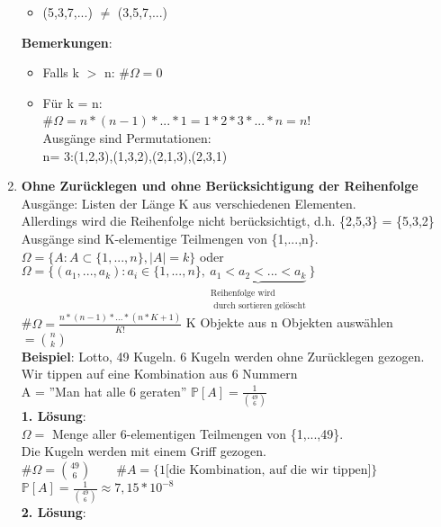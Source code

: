\begin{enumerate}
\begin{itemize}
		\item (5,3,7,...) $\neq$ (3,5,7,...)
	\end{itemize}
	\textbf{Bemerkungen}: 
	\begin{itemize}
		\item Falls k $>$ n: \#$\Omega = 0$
		\item Für k = n:\\
		\#$\Omega = n*(n-1)*...*1 = 1*2*3*...*n = n!$\\Ausgänge sind Permutationen:\\n= 3:(1,2,3),(1,3,2),(2,1,3),(2,3,1)
	\end{itemize}
	\item \textbf{Ohne Zurücklegen und ohne Berücksichtigung der Reihenfolge}\\
	Ausgänge: Listen der Länge K aus verschiedenen Elementen.\\
	Allerdings wird die Reihenfolge nicht berücksichtigt, d.h. \{2,5,3\} = \{5,3,2\}\smallskip\\
	Ausgänge sind K-elementige Teilmengen von \{1,...,n\}.\\
	$\Omega = \{A:A\subset\{1,...,n\},|A| = k\}$ oder \\
	$\Omega = \{(a_1,...,a_k):a_i \in \{1,...,n\},\underbrace{a_1<a_2<...<a_k}_{\substack{\text{Reihenfolge wird}\\\text{ durch sortieren gelöscht}}} \}$\medskip\\
	\#$\Omega = \frac{n*(n-1)*...*(n*K+1)}{K!}$ \hspace{0.5cm}K Objekte aus n Objekten auswählen\smallskip\\
	$ = \binom{n}{k}$\medskip\\
	\textbf{Beispiel}: Lotto, 49 Kugeln. 6 Kugeln werden ohne Zurücklegen gezogen.\\ 
	Wir tippen auf eine Kombination aus 6 Nummern\smallskip\\
	A = ''Man hat alle 6 geraten'' $\mathds{P}[A] = \frac{1}{\binom{49}{6}}$\medskip\\
	\textbf{1. Lösung}:\\
	$\Omega = $ Menge aller 6-elementigen Teilmengen von \{1,...,49\}. \\
	Die Kugeln werden mit einem Griff gezogen.\medskip\\
	\#$\Omega = \binom{49}{6} \qquad \#A = \{1 \text{[die Kombination, auf die wir tippen]}\}$\\
	$\mathds{P}[A] = \frac{1}{\binom{49}{6}} \approx 7,15*10^{-8}$\medskip\\
	\textbf{2. Lösung}:\\

\end{enumerate}
